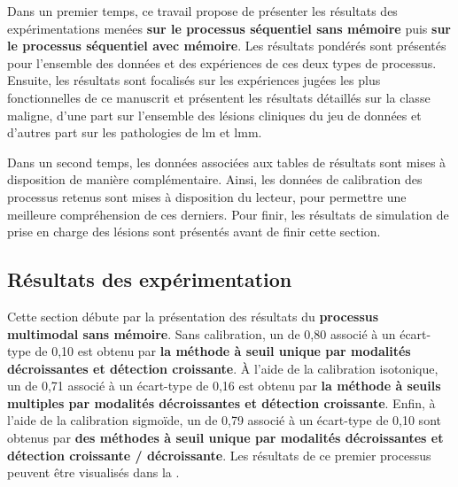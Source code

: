 Dans un premier temps, ce travail propose de présenter les résultats des expérimentations menées \textbf{sur le processus séquentiel sans mémoire} puis \textbf{sur le processus séquentiel avec mémoire}. Les résultats pondérés sont présentés pour l'ensemble des données et des expériences de ces deux types de processus. Ensuite, les résultats sont focalisés sur les expériences jugées les plus fonctionnelles de ce manuscrit et présentent les résultats détaillés sur la classe maligne, d'une part sur l'ensemble des lésions cliniques du jeu de données et d'autres part sur les pathologies de \gls{lm} et \gls{lmm}.\par

Dans un second temps, les données associées aux tables de résultats sont mises à disposition de manière complémentaire. Ainsi, les données de calibration des processus retenus sont mises à disposition du lecteur, pour permettre une meilleure compréhension de ces derniers. Pour finir, les résultats de simulation de prise en charge des lésions sont présentés avant de finir cette section.\par
\clearpage

\subsection{Résultats des expérimentation}
Cette section débute par la présentation des résultats du \textbf{processus multimodal sans mémoire}. Sans calibration, un \fscore{} de 0,80 associé à un écart-type de 0,10 est obtenu par \textbf{la méthode à seuil unique par modalités décroissantes et détection croissante}. À l'aide de la calibration isotonique, un \fscore{} de 0,71 associé à un écart-type de 0,16 est obtenu par \textbf{la méthode à seuils multiples par modalités décroissantes et détection croissante}. Enfin, à l'aide de la calibration sigmoïde, un \fscore{} de 0,79 associé à un écart-type de 0,10 sont obtenus par \textbf{des méthodes à seuil unique par modalités décroissantes et détection croissante / décroissante}. Les résultats de ce premier processus peuvent être visualisés dans la .\par


